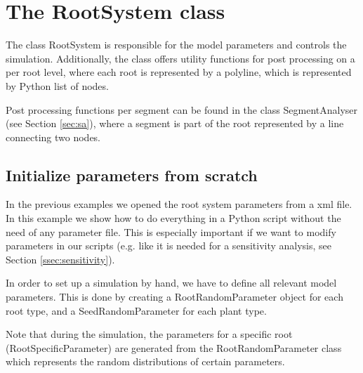 \section{The RootSystem class} \label{sec:rs}

The class RootSystem is responsible for the model parameters and controls the simulation. Additionally, the class offers utility functions for post processing on a per root level, where each root is represented by a polyline, which is represented by Python list of nodes. 

Post processing functions per segment can be found in the class SegmentAnalyser (see Section \ref{sec:sa}), where a segment is part of the root represented by a line connecting two nodes.



\subsection{Initialize parameters from scratch} \label{sec:from_scratch}
 
In the previous examples we opened the root system parameters from a xml file. In this example we show how to do everything in a Python script without the need of any parameter file. This is especially important if we want to modify parameters in our scripts (e.g. like it is needed for a sensitivity analysis, see Section \ref{ssec:sensitivity}).

In order to set up a simulation by hand, we have to define all relevant model parameters. This is done by creating a RootRandomParameter object for each root type, and a SeedRandomParameter for each plant type. 

Note that during the simulation, the parameters for a specific root (RootSpecificParameter) are generated from the RootRandomParameter class which represents the random distributions of certain parameters.



